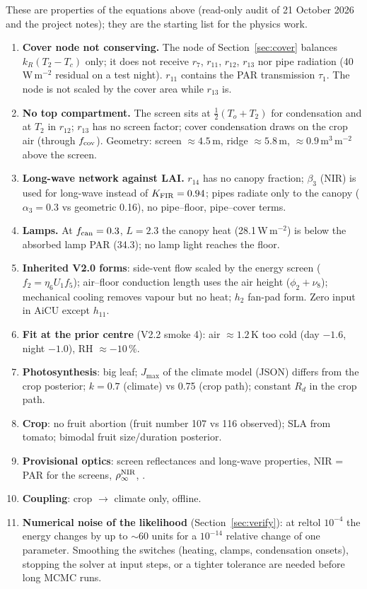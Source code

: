 These are properties of the equations above (read-only audit of 21 October 2026 and the project notes); they are the
starting list for the physics work.
\begin{enumerate}[nosep]
\item \textbf{Cover node not conserving.} The node of Section~\ref{sec:cover} balances $k_R(T_2-T_c)$ only; it does not
receive $r_7$, $r_{11}$, $r_{12}$, $r_{13}$ nor pipe radiation (40\,W\,m$^{-2}$ residual on a test night). $r_{11}$ contains the PAR
transmission $\tau_1$. The node is not scaled by the cover area while $r_{13}$ is.
\item \textbf{No top compartment.} The screen sits at $\tfrac12(T_o+T_2)$ for condensation and at $T_2$ in $r_{12}$; $r_{13}$ has
no screen factor; cover condensation draws on the crop air (through $f_{\rm cov}$). Geometry: screen $\approx4.5$\,m, ridge
$\approx5.8$\,m, $\approx0.9$\,m$^3$\,m$^{-2}$ above the screen.
\item \textbf{Long-wave network against LAI.} $r_{14}$ has no canopy fraction; $\beta_3$ (NIR) is used for long-wave instead of
$K_{\rm FIR}=0.94$; pipes radiate only to the canopy ($\alpha_3=0.3$ vs geometric 0.16), no pipe--floor, pipe--cover terms.
\item \textbf{Lamps.} At $f_{\rm can}=0.3$, $L=2.3$ the canopy heat (28.1\,W\,m$^{-2}$) is below the absorbed lamp PAR (34.3); no
lamp light reaches the floor.
\item \textbf{Inherited V2.0 forms}: side-vent flow scaled by the energy screen ($f_2=\eta_6U_1f_5$); air--floor conduction length
uses the air height ($\phi_2+\nu_8$); mechanical cooling removes vapour but no heat; $h_2$ fan-pad form. Zero input in AiCU
except $h_{11}$.
\item \textbf{Fit at the prior centre} (V2.2 smoke 4): air $\approx1.2$\,K too cold (day $-1.6$, night $-1.0$), RH $\approx-10\,\%$.
\item \textbf{Photosynthesis}: big leaf; $J_{\max}$ of the climate model (JSON) differs from the crop posterior; $k=0.7$ (climate) vs
0.75 (crop path); constant $R_d$ in the crop path.
\item \textbf{Crop}: no fruit abortion (fruit number 107 vs 116 observed); SLA from tomato; bimodal fruit size/duration posterior.
\item \textbf{Provisional optics}: screen reflectances and long-wave properties, NIR = PAR for the screens, $\rho_\infty^{\rm NIR}$,
.
\item \textbf{Coupling}: crop $\to$ climate only, offline.
\item \textbf{Numerical noise of the likelihood} (Section~\ref{sec:verify}): at reltol $10^{-4}$ the energy changes by up to $\sim$60
units for a $10^{-14}$ relative change of one parameter. Smoothing the switches (heating, clamps, condensation onsets),
stopping the solver at input steps, or a tighter tolerance are needed before long MCMC runs.
\end{enumerate}
